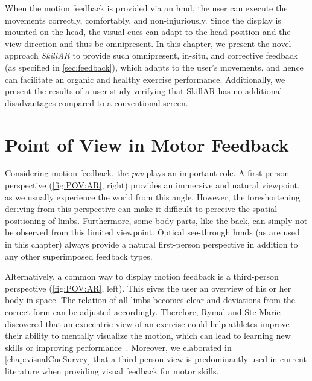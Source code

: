 When the motion feedback is provided via an \acrshort{hmd}, the user can execute the movements correctly, comfortably, and non-injuriously. Since the display is mounted on the head, the visual cues can adapt to the head position and the view direction and thus be omnipresent. In this chapter, we present the novel approach \emph{SkillAR} to provide such omnipresent, in-situ, and corrective feedback (as specified in \autoref{sec:feedback}), which adapts to the user's movements, and hence can facilitate an organic and healthy exercise performance. Additionally, we present the results of a user study verifying that SkillAR has no additional disadvantages compared to a conventional screen.

\section{Point of View in Motor Feedback\label{sec:omnipresent:POV}}
Considering motion feedback, the \emph{\acrshort{pov}} plays an important role. A first-person perspective (\autoref{fig:POV:AR}, right) provides an immersive and natural viewpoint, as we usually experience the world from this angle. However, the foreshortening deriving from this perspective can make it difficult to perceive the spatial positioning of limbs. Furthermore, some body parts, like the back, can simply not be observed from this limited viewpoint. 
Optical see-through \acrshort{hmd}s (as are used in this chapter) always provide a natural first-person perspective in addition to any other superimposed feedback types.

Alternatively, a common way to display motion feedback is a third-person perspective (\autoref{fig:POV:AR}, left). This gives the user an overview of his or her body in space. The relation of all limbs becomes clear and deviations from the correct form can be adjusted accordingly. Therefore, Rymal and Ste-Marie~\cite{rymal2009dsm} discovered that an exocentric view of an exercise could help athletes improve their ability to mentally visualize the motion, which can lead to learning new skills or improving performance~\cite{white1998ida}. Moreover, we elaborated in \autoref{chap:visualCueSurvey} that a third-person view is predominantly used in current literature when providing visual feedback for motor skills.

